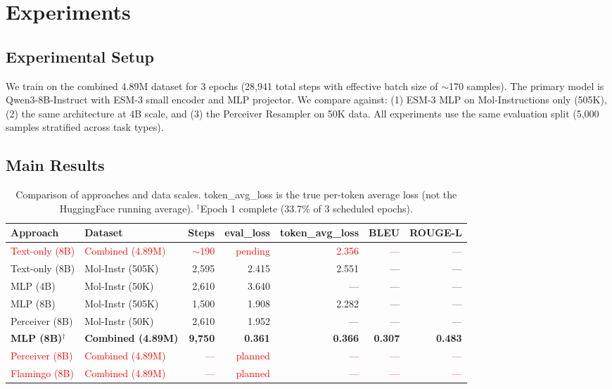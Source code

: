 \documentclass[11pt]{article}
\begin{document}
\section{Experiments}

\subsection{Experimental Setup}

We train on the combined 4.89M dataset for 3 epochs (28,941 total steps with effective batch size of $\sim$170 samples). The primary model is Qwen3-8B-Instruct with ESM-3 small encoder and MLP projector. We compare against: (1) ESM-3 MLP on Mol-Instructions only (505K), (2) the same architecture at 4B scale, and (3) the Perceiver Resampler on 50K data. All experiments use the same evaluation split (5,000 samples stratified across task types).

\subsection{Main Results}

\begin{table}[t]
    \centering
    \caption{Comparison of approaches and data scales. token\_avg\_loss is the true per-token average loss (not the HuggingFace running average). $^\dagger$Epoch 1 complete (33.7\% of 3 scheduled epochs).}
    \label{tab:main_results}
    \begin{tabular}{@{}llrrrrr@{}}
        \toprule
        Approach & Dataset & Steps & eval\_loss & token\_avg\_loss & BLEU & ROUGE-L \\
        \midrule
        \textcolor{red}{Text-only (8B)} & \textcolor{red}{Combined (4.89M)} & \textcolor{red}{$\sim$190} & \textcolor{red}{pending} & \textcolor{red}{2.356} & \textcolor{red}{---} & \textcolor{red}{---} \\
        Text-only (8B) & Mol-Instr (505K) & 2,595 & 2.415 & 2.551 & --- & --- \\
        MLP (4B) & Mol-Instr (50K) & 2,610 & 3.640 & --- & --- & --- \\
        MLP (8B) & Mol-Instr (505K) & 1,500 & 1.908 & 2.282 & --- & --- \\
        Perceiver (8B) & Mol-Instr (50K) & 2,610 & 1.952 & --- & --- & --- \\
        \textbf{MLP (8B)}$^\dagger$ & \textbf{Combined (4.89M)} & \textbf{9,750} & \textbf{0.361} & \textbf{0.366} & \textbf{0.307} & \textbf{0.483} \\
        \midrule
        \textcolor{red}{Perceiver (8B)} & \textcolor{red}{Combined (4.89M)} & \textcolor{red}{---} & \textcolor{red}{planned} & \textcolor{red}{---} & \textcolor{red}{---} & \textcolor{red}{---} \\
        \textcolor{red}{Flamingo (8B)} & \textcolor{red}{Combined (4.89M)} & \textcolor{red}{---} & \textcolor{red}{planned} & \textcolor{red}{---} & \textcolor{red}{---} & \textcolor{red}{---} \\
        \bottomrule
    \end{tabular}
\end{table}
\end{document}
